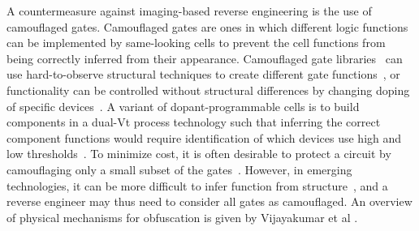\documentclass[proposal]{umassthesis}  %
\begin{document}
A countermeasure against imaging-based reverse engineering is the use of camouflaged gates. Camouflaged gates are ones in which different logic functions can be implemented by same-looking cells to prevent the cell functions from being correctly inferred from their appearance. Camouflaged gate libraries~\cite{syphermedia-library} can use hard-to-observe structural techniques to create different gate functions~\cite{cocchi-14}, or functionality can be controlled without structural differences by changing doping of specific devices~\cite{becker-13,shiozaki-14,malik-obfusgate,iyengar-15}. {A variant of dopant-programmable cells is to build components in a dual-Vt process technology such that inferring the correct component functions would require identification of which devices use high and low thresholds~\cite{collantes-16}. To minimize cost, it is often desirable to protect a circuit by camouflaging only a small subset of the gates~\cite{chakraborty-09,rajendran-13}.} However, in emerging technologies, it can be more difficult to infer function from structure~\cite{bi2016emerging}, and a reverse engineer may thus need to consider all gates as camouflaged. An overview of physical mechanisms for obfuscation is given by Vijayakumar et al \cite{vijayakumar-2017-physical}.
\end{document}
